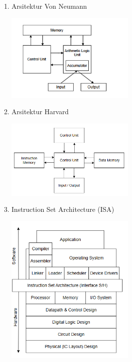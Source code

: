 \documentclass[12pt]{article}
\begin{document}
\begin{enumerate}
    \item Arsitektur Von Neumann
    
    \noindent
    \begin{minipage}{\linewidth}
        \centering
        \includegraphics[width=0.5\textwidth]{asset/image1.png} 
    \end{minipage}
    
    \item Arsitektur Harvard
    
    \noindent
    \begin{minipage}{\linewidth}
        \centering
        \includegraphics[width=0.5\textwidth]{asset/image2.png} 
    \end{minipage}

    \item Instruction Set Architecture (ISA)
        
    \noindent
    \begin{minipage}{\linewidth}
        \centering
        \includegraphics[width=0.5\textwidth]{asset/image3.png} 
    \end{minipage}


\end{enumerate}
\end{document}
